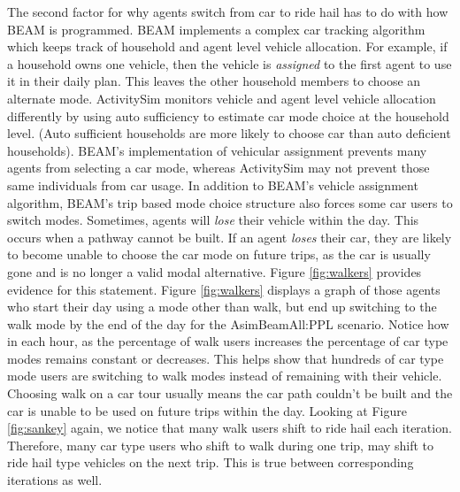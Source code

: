 \documentclass[12pt, oneside, openright]{byuthesis}
\begin{document}
The second factor for why agents switch from car to ride hail has to do with how BEAM is programmed. BEAM implements a complex car tracking algorithm which keeps track of household and agent level vehicle allocation. For example, if a household owns one vehicle, then the vehicle is \emph{assigned} to the first agent to use it in their daily plan. This leaves the other household members to choose an alternate mode. ActivitySim monitors vehicle and agent level vehicle allocation differently by using auto sufficiency to estimate car mode choice at the household level. (Auto sufficient households are more likely to choose car than auto deficient households). BEAM's implementation of vehicular assignment prevents many agents from selecting a car mode, whereas ActivitySim may not prevent those same individuals from car usage. In addition to BEAM's vehicle assignment algorithm, BEAM's trip based mode choice structure also forces some car users to switch modes. Sometimes, agents will \emph{lose} their vehicle within the day. This occurs when a pathway cannot be built. If an agent \emph{loses} their car, they are likely to become unable to choose the car mode on future trips, as the car is usually gone and is no longer a valid modal alternative. Figure \ref{fig:walkers} provides evidence for this statement. Figure \ref{fig:walkers} displays a graph of those agents who start their day using a mode other than walk, but end up switching to the walk mode by the end of the day for the AsimBeamAll:PPL scenario. Notice how in each hour, as the percentage of walk users increases the percentage of car type modes remains constant or decreases. This helps show that hundreds of car type mode users are switching to walk modes instead of remaining with their vehicle. Choosing walk on a car tour usually means the car path couldn't be built and the car is unable to be used on future trips within the day. Looking at Figure \ref{fig:sankey} again, we notice that many walk users shift to ride hail each iteration. Therefore, many car type users who shift to walk during one trip, may shift to ride hail type vehicles on the next trip. This is true between corresponding iterations as well.
\end{document}
